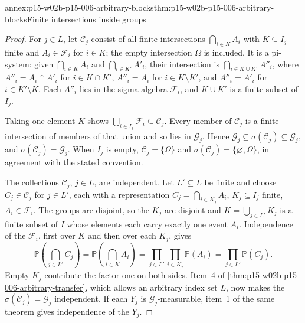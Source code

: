 \begin{annexitem}{annex:p15-w02b-p15-006-arbitrary-blocks}{thm:p15-w02b-p15-006-arbitrary-blocks}{Finite intersections inside groups}
\begin{proof}
For \(j\in L\), let \(\mathcal C_j\) consist of all finite intersections
\(\bigcap_{i\in K}A_i\) with \(K\subseteq I_j\) finite and
\(A_i\in\mathcal F_i\) for \(i\in K\); the empty intersection
\(\Omega\) is included. It is a pi-system: given
\(\bigcap_{i\in K}A_i\) and \(\bigcap_{i\in K'}A'_i\), their
intersection is \(\bigcap_{i\in K\cup K'}A''_i\), where
\(A''_i=A_i\cap A'_i\) for \(i\in K\cap K'\), \(A''_i=A_i\) for
\(i\in K\setminus K'\), and \(A''_i=A'_i\) for \(i\in K'\setminus K\).
Each \(A''_i\) lies in the sigma-algebra \(\mathcal F_i\), and
\(K\cup K'\) is a finite subset of \(I_j\).

Taking one-element \(K\) shows
\(\bigcup_{i\in I_j}\mathcal F_i\subseteq\mathcal C_j\). Every member of
\(\mathcal C_j\) is a finite intersection of members of that union and
so lies in \(\mathcal G_j\). Hence
\(\mathcal G_j\subseteq\sigma(\mathcal C_j)\subseteq\mathcal G_j\),
and \(\sigma(\mathcal C_j)=\mathcal G_j\). When \(I_j\) is empty,
\(\mathcal C_j=\{\Omega\}\) and \(\sigma(\mathcal C_j)=\{\varnothing,\Omega\}\),
in agreement with the stated convention.

The collections \(\mathcal C_j\), \(j\in L\), are independent. Let
\(L'\subseteq L\) be finite and choose \(C_j\in\mathcal C_j\) for
\(j\in L'\), each with a representation
\(C_j=\bigcap_{i\in K_j}A_i\), \(K_j\subseteq I_j\) finite,
\(A_i\in\mathcal F_i\). The groups are disjoint, so the \(K_j\) are
disjoint and \(K=\bigcup_{j\in L'}K_j\) is a finite subset of \(I\)
whose elements each carry exactly one event \(A_i\). Independence of
the \(\mathcal F_i\), first over \(K\) and then over each \(K_j\), gives
\[
 \mathbb P\left(\bigcap_{j\in L'}C_j\right)
   =\mathbb P\left(\bigcap_{i\in K}A_i\right)
   =\prod_{j\in L'}\prod_{i\in K_j}\mathbb P(A_i)
   =\prod_{j\in L'}\mathbb P(C_j).
\]
Empty \(K_j\) contribute the factor one on both sides. Item~4 of
\cref{thm:p15-w02b-p15-006-arbitrary-transfer}, which allows an
arbitrary index set \(L\), now makes the \(\sigma(\mathcal C_j)=\mathcal G_j\)
independent. If each \(Y_j\) is \(\mathcal G_j\)-measurable, item~1 of
the same theorem gives independence of the \(Y_j\).
\end{proof}
\end{annexitem}

